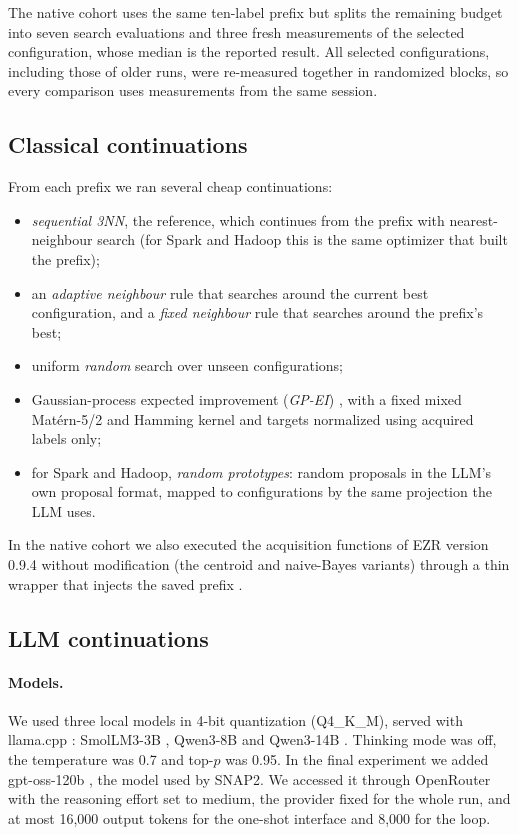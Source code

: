 The native cohort uses the same ten-label prefix but splits the remaining budget into seven search evaluations and three fresh measurements of the selected configuration, whose median is the reported result. All selected configurations, including those of older runs, were re-measured together in randomized blocks, so every comparison uses measurements from the same session.

\subsection{Classical continuations}

From each prefix we ran several cheap continuations:
\begin{itemize}
  \item \emph{sequential 3NN}, the reference, which continues from the prefix with nearest-neighbour search (for Spark and Hadoop this is the same optimizer that built the prefix);
  \item an \emph{adaptive neighbour} rule that searches around the current best configuration, and a \emph{fixed neighbour} rule that searches around the prefix's best;
  \item uniform \emph{random} search over unseen configurations;
  \item Gaussian-process expected improvement (\emph{GP-EI}) \cite{jones1998ego}, with a fixed mixed Mat\'ern-5/2 and Hamming kernel and targets normalized using acquired labels only;
  \item for Spark and Hadoop, \emph{random prototypes}: random proposals in the LLM's own proposal format, mapped to configurations by the same projection the LLM uses.
\end{itemize}
In the native cohort we also executed the acquisition functions of EZR version 0.9.4 without modification (the centroid and naive-Bayes variants) through a thin wrapper that injects the saved prefix \cite{menzies2026ezr}.

\subsection{LLM continuations}

\paragraph{Models.} We used three local models in 4-bit quantization (Q4\_K\_M), served with llama.cpp \cite{gerganov2023llamacpp}: SmolLM3-3B \cite{huggingface2025smollm3}, Qwen3-8B and Qwen3-14B \cite{qwen2025qwen3}. Thinking mode was off, the temperature was 0.7 and top-$p$ was 0.95. In the final experiment we added gpt-oss-120b \cite{openai2025gptoss}, the model used by SNAP2. We accessed it through OpenRouter \cite{openrouter2025} with the reasoning effort set to medium, the provider fixed for the whole run, and at most 16,000 output tokens for the one-shot interface and 8,000 for the loop.

